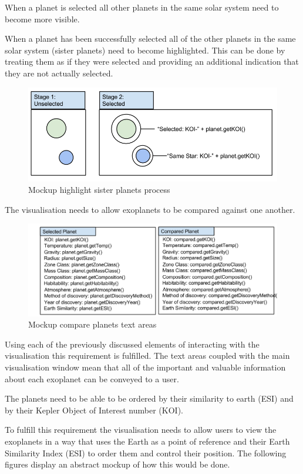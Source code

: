 \begin{enumerate}
When a planet is selected all other planets in the same solar system
need to become more visible.

When a planet has been successfully selected all of the other planets in the
same solar system (sister planets) need to become highlighted. This can be done
by treating them as if they were selected and providing an additional indication
that they are not actually selected.  
\begin{figure}[h!]
  \centering
      \includegraphics[width=.8\textwidth]{images/selectedSisterPlanets.png}
  \caption{Mockup highlight sister planets process}  
\end{figure}

{\bf
 \item[R2.] The visualisation needs to allow exoplanets to be compared against
one another.}

\begin{figure}[h!]
  \centering
      \includegraphics[width=.7\textwidth]{images/mockComparePlanets.png}
  \caption{Mockup compare planets text areas}  
\end{figure}

Using each of the previously discussed elements of interacting with the
visualisation this requirement is fulfilled. The text areas coupled with the
main visualisation window mean that all of the important and valuable
information about each exoplanet can be conveyed to a user.

{\bf
 \item[R3.] The planets need to be able to be ordered by their similarity to
earth (ESI) and by their Kepler Object of Interest number (KOI).}

To fulfill this requirement the visualisation needs to allow users to view the
exoplanets in a way that uses the Earth as a point of reference and their Earth
Similarity Index (ESI) to order them and control their position. The following
figures display an abstract mockup of how this would be done.


\end{enumerate}
